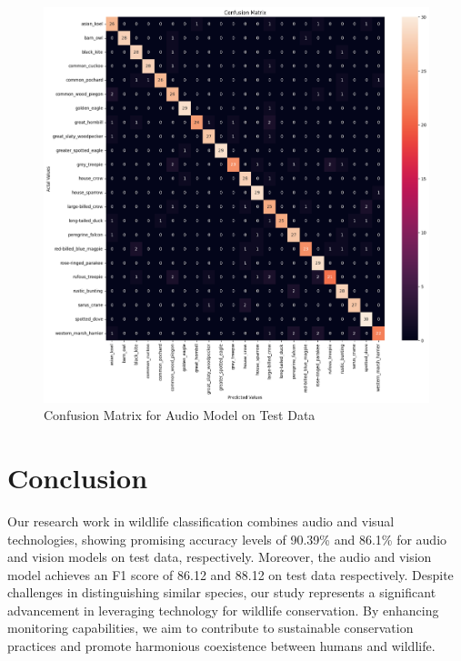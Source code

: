 \documentclass[fleqn, 10pt, twoside]{IOEGC}
\begin{document}
\begin{figure}[t] %
	\centering
	\begin{minipage}{\textwidth} %
		\includegraphics[scale=0.4]{Graphics/audio_cm.png} %
		\caption{Confusion Matrix for Audio Model on Test Data}
		\label{cm_audio}
	\end{minipage}
\end{figure}



\clearpage
\section{Conclusion}
Our research work in wildlife classification combines audio and visual technologies, showing promising accuracy levels of 90.39\% and 86.1\% for audio and vision models on test data, respectively. Moreover, the audio and vision model achieves an F1 score of 86.12 and 88.12 on test data respectively. Despite challenges in distinguishing similar species, our study represents a significant advancement in leveraging technology for wildlife conservation. By enhancing monitoring capabilities, we aim to contribute to sustainable conservation practices and promote harmonious coexistence between humans and wildlife.
\end{document}

